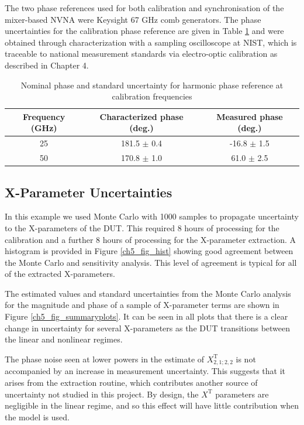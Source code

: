 \documentclass[../thesis/thesis.tex]{subfiles}
\begin{document}
\begin{refsection}
The two phase references used for both calibration and synchronisation of the mixer-based NVNA were Keysight 67 GHz comb generators\cite{Keysight_2014}. The phase uncertainties for the calibration phase reference are given in Table \ref{ch5_table_phaseunc} and were obtained through characterization with a sampling oscilloscope at NIST, which is traceable to national measurement standards via electro-optic calibration \cite{Reader_2008, Hale_2009} as described in Chapter 4.

\begin{table}[]
	\centering
	\caption{Nominal phase and standard uncertainty for harmonic phase reference at calibration frequencies}
	\label{ch5_table_phaseunc}
	\begin{tabular}{ccc}
		\hline
		Frequency (GHz) & Characterized phase (deg.) & Measured phase (deg.)\\ \hline
		25 & 181.5 $\pm$ 0.4 & -16.8 $\pm$ 1.5 \\ 
		50 & 170.8 $\pm$ 1.0 & 61.0 $\pm$ 2.5 \\ 
		\hline
	\end{tabular}
\end{table}

\subsection{X-Parameter Uncertainties}

In this example we used Monte Carlo with 1000 samples to propagate uncertainty to the X-parameters of the DUT. This required 8 hours of processing for the calibration and a further 8 hours of processing for the X-parameter extraction. A histogram is provided in Figure \ref{ch5_fig_hist} showing good agreement between the Monte Carlo and sensitivity analysis. This level of agreement is typical for all of the extracted X-parameters.

The estimated values and standard uncertainties from the Monte Carlo analysis for the magnitude and phase of a sample of X-parameter terms are shown in Figure \ref{ch5_fig_summaryplots}. It can be seen in all plots that there is a clear change in uncertainty for several X-parameters as the DUT transitions between the linear and nonlinear regimes.

The phase noise seen at lower powers in the estimate of $X^\textrm{T}_{2,1;2,2}$ is not accompanied by an increase in measurement uncertainty. This suggests that it arises from the extraction routine, which contributes another source of uncertainty not studied in this project. By design, the $X^\textrm{T}$ parameters are negligible in the linear regime, and so this effect will have little contribution when the model is used.


\end{refsection}
\end{document}
